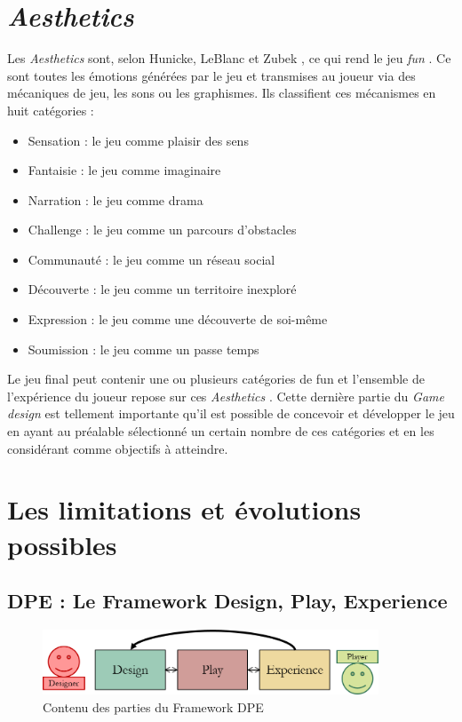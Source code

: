 \section{\emph{Aesthetics}}
Les \emph{Aesthetics} sont, selon Hunicke, LeBlanc et Zubek \cite{MDA_formal}, \guillemotleft ce qui rend le jeu \emph{fun} \guillemotright . 
Ce sont toutes les émotions générées par le jeu et transmises au joueur via des mécaniques de jeu, les sons ou les graphismes. Ils classifient ces mécanismes en huit catégories :
\begin{itemize}
    \item Sensation : le jeu comme plaisir des sens
    \item Fantaisie : le jeu comme imaginaire
    \item Narration : le jeu comme drama
    \item Challenge : le jeu comme un parcours d'obstacles
    \item Communauté : le jeu comme un réseau social
    \item Découverte : le jeu comme un territoire inexploré
    \item Expression : le jeu comme une découverte de soi-même
    \item Soumission : le jeu comme un passe temps
\end{itemize}

Le jeu final peut contenir une ou plusieurs catégories de \guillemotleft fun \guillemotright et l'ensemble de l'expérience du joueur repose sur ces \emph{Aesthetics} . 
Cette dernière partie du \emph{Game design} est tellement importante qu'il est possible de concevoir et développer le jeu en ayant au préalable sélectionné un certain nombre de ces catégories et en les considérant comme objectifs à atteindre.




\section{Les limitations et évolutions possibles}
\subsection{DPE : Le Framework Design, Play, Experience}

\begin{figure}[H]
    \centering
    \includegraphics[width=10cm]{10_img/chap3/dpe.png} 
    \caption{Contenu des parties du Framework DPE \cite{Winn2011}}
    \label{fig.dpe}
\end{figure}

